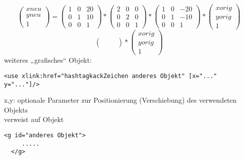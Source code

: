 \[
\left( {\begin{array}{c}
xneu \\
yneu \\
1
\end{array} } \right)
=
\left( {\begin{array}{ccc}
1 & 0 & 20 \\
0 & 1 & 10 \\
0 & 0 & 1
\end{array} } \right)
*
\left( {\begin{array}{ccc}
2 & 0 & 0 \\
0 & 2 & 0 \\
0 & 0 & 1
\end{array} } \right)
*
\left( {\begin{array}{ccc}
1 & 0 & -20 \\
0 & 1 & -10 \\
0 & 0 & 1
\end{array} } \right)
*
\left( {\begin{array}{c}
xorig \\
yorig \\
1
\end{array} } \right)
\] 
\[
\left( {\begin{array}{ccc}
 &  &  \\
 &  &  \\
 &  & 
\end{array} } \right)
*
\left( {\begin{array}{c}
xorig \\
yorig \\
1
\end{array} } \right)
\]
weiteres „grafisches“ Objekt:
\begin{lstlisting}[caption={Scherung mit der transform Syntax}, label={lst:text-Tag}, language={SVG}]
  <use xlink:href="hashtagkackZeichen anderes Objekt" [x="..." y="..."]/>
\end{lstlisting}
x,y: optionale Parameter zur Positionierung (Verschiebung) des verwendeten Objekts\\
verweist auf Objekt
\begin{lstlisting}[caption={Scherung mit der transform Syntax}, label={lst:text-Tag}, language={SVG}]
  <g id="anderes Objekt">
     .....
  </g>
\end{lstlisting}
